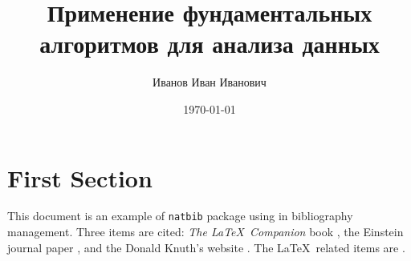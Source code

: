 \documentclass[a4paper,12pt]{article}
\author{Иванов Иван Иванович}
\title{Применение фундаментальных алгоритмов для анализа данных}
\date{\today}
\begin{document}
\maketitle

\tableofcontents

\clearpage

\section{First Section}
This document is an example of \texttt{natbib} package using in bibliography management. Three items are cited: \textit{The \LaTeX\ Companion} book \cite{latexcompanion}, the Einstein journal paper \citet{einstein}, and the Donald Knuth's website \cite{knuthwebsite}. The \LaTeX\ related items are \cite{latexcompanion,knuthwebsite}.

\clearpage


\end{document}
